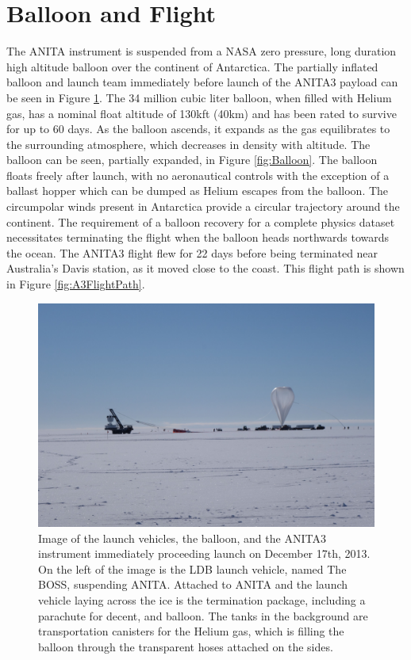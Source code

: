 \section{Balloon and Flight}
		The ANITA instrument is suspended from a NASA zero pressure, long duration high altitude balloon over the continent of Antarctica.  The partially inflated balloon and launch team immediately before launch of the ANITA3 payload can be seen in Figure \ref{fig:Launch}.  The 34 million cubic liter balloon, when filled with Helium gas, has a nominal float altitude of 130kft (40km) and has been rated to survive for up to 60 days.  As the balloon ascends, it expands as the gas equilibrates to the surrounding atmosphere, which decreases in density with altitude. The balloon can be seen, partially expanded, in Figure \ref{fig:Balloon}.  The balloon floats freely after launch, with no aeronautical controls with the exception of a ballast hopper which can be dumped as Helium escapes from the balloon. The circumpolar winds present in Antarctica provide a circular trajectory around the continent.  The requirement of a balloon recovery for a complete physics dataset necessitates terminating the flight when the balloon heads northwards towards the ocean.  The ANITA3 flight flew for 22 days before being terminated near Australia's Davis station, as it moved close to the coast.  This flight path is shown in Figure \ref{fig:A3FlightPath}.

\begin{figure}
\centering
	\includegraphics[width=\textwidth]{figures/Launch}
	\caption{Image of the launch vehicles, the balloon, and the ANITA3 instrument immediately proceeding launch on December 17th, 2013.  On the left of the image is the LDB launch vehicle, named The BOSS, suspending ANITA.  Attached to ANITA and the launch vehicle laying across the ice is the termination package, including a parachute for decent, and balloon.  The tanks in the background are transportation canisters for the Helium gas, which is filling the balloon through the transparent hoses attached on the sides.}
	\label{fig:Launch}
\end{figure}
			
